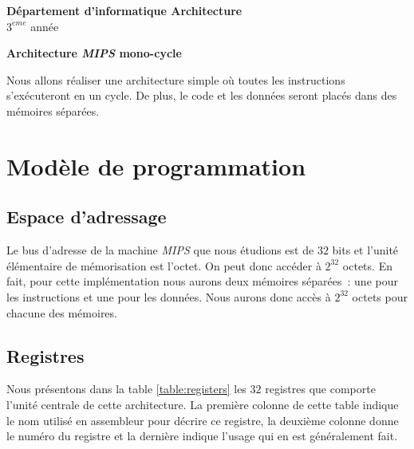 \documentclass[12pt]{article}
\begin{document}
\noindent
{\bf Département d'informatique \hfill Architecture} \\
$3^{\grave{e}me}$ année
\vspace*{1cm}
\begin{center}
{\large \bf Architecture \emph{MIPS} mono-cycle}
\end{center}

\renewcommand{\labelitemi}{$\bullet$}
\renewcommand{\labelitemii}{$\star$}

Nous allons réaliser une architecture simple où toutes les instructions s'exécuteront en un cycle. De plus, le code et les données
seront placés dans des mémoires séparées.

\section{Modèle de programmation}

\subsection{Espace d'adressage}

Le bus d'adresse de la machine \emph{MIPS} que nous étudions est de $32$ bits et l'unité élémentaire
de mémorisation est l'octet. On peut donc accéder à $2^{32}$ octets. En fait,
pour cette implémentation nous aurons deux mémoires séparées~: une pour les instructions et une pour les données. Nous aurons
donc accès à $2^{32}$ octets pour chacune des mémoires.

\subsection{Registres}

Nous présentons dans la table \ref{table:registers}
les $32$ registres que comporte l'unité centrale de cette architecture. La première colonne de cette table indique
le nom utilisé en assembleur pour décrire ce registre, la deuxième colonne donne le numéro du registre et
la dernière indique l'usage qui en est généralement fait.
\end{document}
